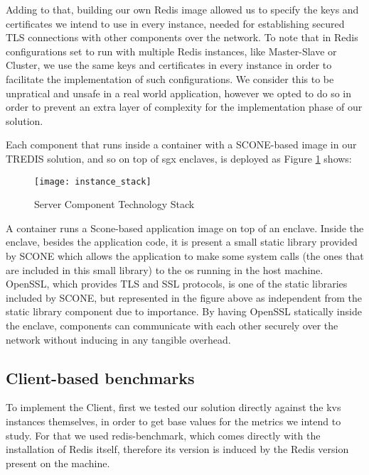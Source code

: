 Adding to that, building our own Redis image allowed us to specify the keys and certificates we intend to use in every instance, needed for establishing secured TLS connections with other components over the network. To note that in Redis configurations set to run with multiple Redis instances, like Master-Slave or Cluster, we use the same keys and certificates in every instance in order to facilitate the implementation of such configurations. We consider this to be unpratical and unsafe in a real world application, however we opted to do so in order to prevent an extra layer of complexity for the implementation phase of our solution.


\vspace{3mm}
Each component that runs inside a container with a SCONE-based image in our TREDIS solution, and so on top of \gls{sgx} enclaves, is deployed as Figure \ref{fig:instanceStack} shows:
\begin{figure}[htbp]
	\centering
	{\texttt{[image: instance\_stack]}}
	\caption{Server Component Technology Stack}
	\label{fig:instanceStack}
\end{figure}

A container runs a Scone-based application image on top of an enclave. Inside the enclave, besides the application code, it is present a small static library provided by SCONE which allows the application to make some system calls (the ones that are included in this small library) to the \gls{os} running in the host machine. OpenSSL, which provides TLS and SSL protocols, is one of the static libraries included by SCONE, but represented in the figure above as independent from the static library component due to importance. By having OpenSSL statically inside the enclave, components can communicate with each other securely over the network without inducing in any tangible overhead. 



\subsection{Client-based benchmarks}

To implement the Client, first we tested our solution directly against the \gls{kvs} instances themselves, in order to get base values for the metrics we intend to study. For that we used redis-benchmark, which comes directly with the installation of Redis itself, therefore its version is induced by the Redis version present on the machine.

